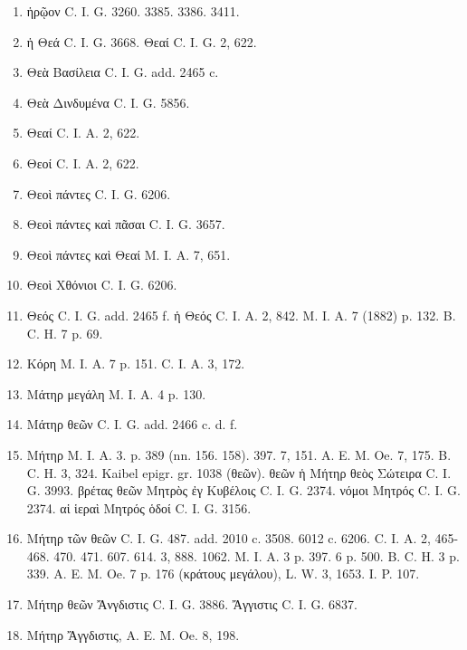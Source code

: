 \documentclass[a4paper, 11pt, oneside, polutonikogreek, german]{article}
\begin{document}
\begin{enumerate}
\item ἡρῷον C. I. G. 3260. 3385. 3386. 3411.

\item ἡ Θεά C. I. G. 3668. Θεαί C. I. G. 2, 622.

\item Θεὰ Βασίλεια C. I. G. add. 2465 c.

\item Θεὰ Δινδυμένα C. I. G. 5856.

\item Θεαί C. I. A. 2, 622.

\item Θεοί C. I. A. 2, 622.

\item Θεοὶ πάντες C. I. G. 6206.

\item Θεοὶ πάντες καὶ πᾶσαι C. I. G. 3657.

\item Θεοὶ πάντες καὶ Θεαί M. I. A. 7, 651.

\item Θεοὶ Χθόνιοι C. I. G. 6206.

\item Θεός C. I. G. add. 2465 f. ἡ Θεός C. I. A. 2, 842. M. I. A. 7 (1882) p. 132. B. C. H. 7 p. 69.

\item Κόρη M. I. A. 7 p. 151. C. I. A. 3, 172.

\item Μάτηρ μεγάλη M. I. A. 4 p. 130.

\item Μάτηρ θεῶν C. I. G. add. 2466 c. d. f.

\item Μήτηρ M. I. A. 3. p. 389 (nn. 156. 158). 397. 7, 151. A. E. M. Oe. 7, 175. B. C. H. 3, 324. Kaibel epigr. gr. 1038 (θεῶν). θεῶν ἡ Μήτηρ θεὸς Σώτειρα C. I. G. 3993. βρέτας θεῶν Μητρὸς ἐγ Κυβέλοις C. I. G. 2374. νόμοι Μητρός C. I. G. 2374. αἱ ἱεραὶ Μητρός ὁδοί C. I. G. 3156.

\item Μήτηρ τῶν θεῶν C. I. G. 487. add. 2010 c. 3508. 6012 c. 6206. C. I. A. 2, 465-468. 470. 471. 607. 614. 3, 888. 1062. M. I. A. 3 p. 397. 6 p. 500. B. C. H. 3 p. 339. A. E. M. Oe. 7 p. 176 (κράτους μεγάλου), L. W. 3, 1653. I. P. 107.

\item Μήτηρ θεῶν Ἄνγδιστις C. I. G. 3886. Ἄγγιστις C. I. G. 6837.

\item Μήτηρ Ἄγγδιστις, A. E. M. Oe. 8, 198.


\end{enumerate}
\end{document}
